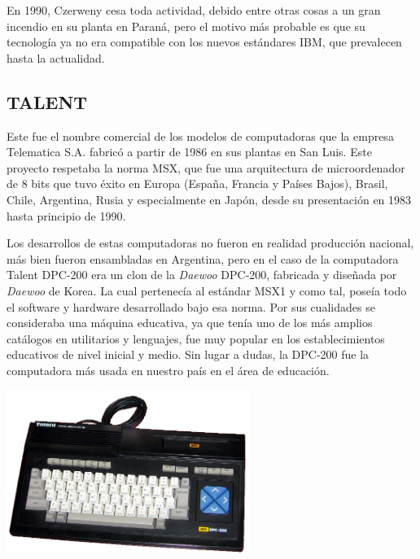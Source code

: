 \documentclass[%
  	final,
%
	notitlepage,
	narroweqnarray,
	inline,
 	twoside,
	]{ieee}
\begin{document}

En 1990, Czerweny cesa toda actividad, debido entre otras cosas a un gran incendio en su planta en Paran\'a, pero el motivo m\'as probable es que su tecnolog\'ia ya no era compatible con los nuevos est\'andares IBM, que prevalecen hasta la actualidad.

\subsection*{TALENT}

Este fue el nombre comercial de los modelos de computadoras que la empresa Telematica S.A. fabric\'o a partir de 1986 en sus plantas en San Luis. Este proyecto respetaba la norma MSX\cite{msx}, que fue una arquitectura de microordenador de 8 bits que tuvo \'exito en Europa (Espa\~na, Francia y Pa\'ises Bajos), Brasil, Chile, Argentina, Rusia y especialmente en Jap\'on, desde su presentaci\'on en 1983 hasta principio de 1990.

Los desarrollos de estas computadoras no fueron en realidad producci\'on nacional, m\'as bien fueron ensambladas en Argentina, pero en el caso de la computadora Talent DPC-200 era un clon de la \textit{Daewoo} DPC-200, fabricada y dise\~nada por \textit{Daewoo} de Korea. La cual pertenec\'ia al est\'andar MSX1 y como tal, pose\'ia todo el software y hardware desarrollado bajo esa norma.
Por sus cualidades se consideraba una m\'aquina educativa, ya que ten\'ia uno de los m\'as amplios cat\'alogos en utilitarios y lenguajes, fue muy popular en los establecimientos educativos de nivel inicial y medio. Sin lugar a dudas, la DPC-200 fue la computadora m\'as usada en nuestro pa\'is en el \'area de educaci\'on.

\begin{center}\includegraphics[width=224pt, height=150pt]{talent.png}\end{center}
\end{document}

